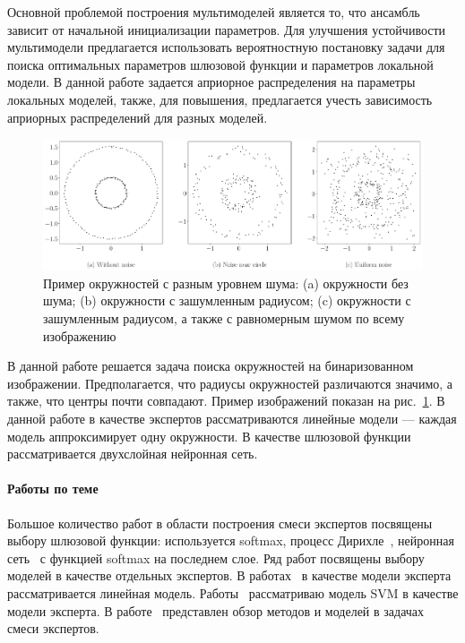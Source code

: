 \documentclass[12pt, twoside]{article}
\numberwithin{equation}{section}
\begin{document}
Основной проблемой построения мультимоделей является то, что ансамбль зависит от начальной инициализации параметров. Для улучшения устойчивости мультимодели предлагается использовать вероятностную постановку задачи для поиска оптимальных параметров шлюзовой функции и параметров локальной модели. В данной работе задается априорное распределения на параметры локальных моделей, также, для повышения, предлагается учесть зависимость априорных распределений для разных моделей.

\begin{figure}[h!t]\center
\includegraphics[width=1\textwidth]{result_eng/statment}
\caption{Пример окружностей с разным уровнем шума: (a) окружности без шума; (b) окружности с зашумленным радиусом; (c) окружности с зашумленным радиусом, а также с равномерным шумом по всему изображению}
\label{example:1}
\end{figure}

В данной работе решается задача поиска окружностей на бинаризованном изображении. Предполагается, что радиусы окружностей различаются значимо, а также, что центры почти совпадают. Пример изображений показан на рис.~\ref{example:1}. В данной работе в качестве экспертов рассматриваются линейные модели --- каждая модель аппроксимирует одну окружности. В качестве шлюзовой функции рассматривается двухслойная нейронная сеть.

\paragraph{Работы по теме}
Большое количество работ в области построения смеси экспертов посвящены выбору шлюзовой функции: используется softmax, процесс Дирихле~\cite{Edward2002}, нейронная сеть~\cite{Shazeer2017} с функцией softmax на последнем слое. Ряд работ посвящены выбору моделей в качестве отдельных экспертов. В работах~\cite{Jordan1994, Jordan1991} в качестве модели эксперта рассматривается линейная модель. Работы~\cite{Lima2007, Cao2003} рассматриваю модель SVM в качестве модели эксперта.
В работе~\cite{Yuksel2012} представлен обзор методов и моделей в задачах смеси экспертов.
\end{document}
